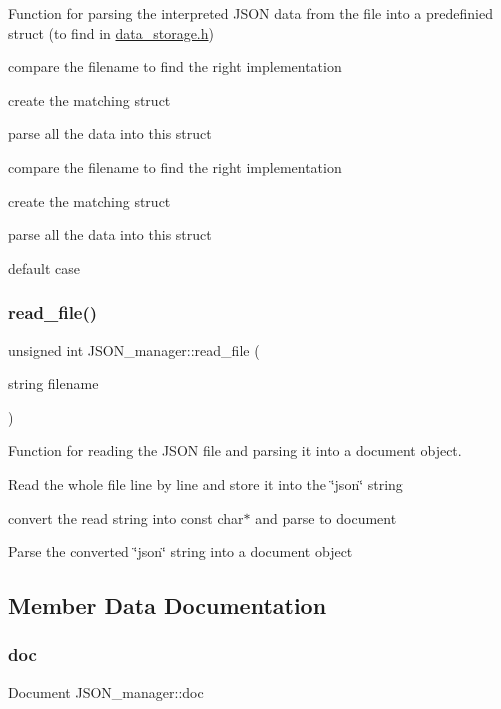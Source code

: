 Function for parsing the interpreted J\+S\+ON data from the file into a predefinied struct (to find in \hyperlink{data__storage_8h}{data\+\_\+storage.\+h}) 

compare the filename to find the right implementation

create the matching struct

parse all the data into this struct

compare the filename to find the right implementation

create the matching struct

parse all the data into this struct

default case \mbox{\label{classJSON__manager_a9b600a34d73fd3f28bf00ddf3f2e6640}} 
\subsubsection{\texorpdfstring{read\+\_\+file()}{read\_file()}}
{\footnotesize\ttfamily unsigned int J\+S\+O\+N\+\_\+manager\+::read\+\_\+file (\begin{DoxyParamCaption}\item[{string}]{filename }\end{DoxyParamCaption})}



Function for reading the J\+S\+ON file and parsing it into a document object. 

Read the whole file line by line and store it into the \char`\"{}json\char`\"{} string

convert the read string into const char$\ast$ and parse to document

Parse the converted \char`\"{}json\char`\"{} string into a document object 

\subsection{Member Data Documentation}
\mbox{\label{classJSON__manager_afa1c5569b74bd68fe785d553c798c4dd}} 
\subsubsection{\texorpdfstring{doc}{doc}}
{\footnotesize\ttfamily Document J\+S\+O\+N\+\_\+manager\+::doc\hspace{0.3cm}{\ttfamily [private]}}



